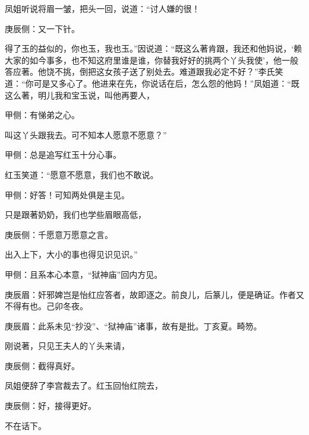 \begin{parag}
    凤姐听说将眉一皱，把头一回，说道：“讨人嫌的很！\begin{note}庚辰侧：又一下针。\end{note}得了玉的益似的，你也玉，我也玉。”因说道：“既这么著肯跟，我还和他妈说，‘赖大家的如今事多，也不知这府里谁是谁，你替我好好的挑两个丫头我使’，他一般答应著。他饶不挑，倒把这女孩子送了别处去。难道跟我必定不好？”李氏笑道：“你可是又多心了。他进来在先，你说话在后，怎么怨的他妈！”凤姐道：“既这么著，明儿我和宝玉说，叫他再要人，\begin{note}甲侧：有悌弟之心。\end{note}叫这丫头跟我去。可不知本人愿意不愿意？”\begin{note}甲侧：总是追写红玉十分心事。\end{note}红玉笑道：“愿意不愿意，我们也不敢说。\begin{note}甲侧：好答！可知两处俱是主见。\end{note}只是跟著奶奶，我们也学些眉眼高低，\begin{note}庚辰侧：千愿意万愿意之言。\end{note}出入上下，大小的事也得见识见识。”\begin{note}甲侧：且系本心本意，“狱神庙”回内方见。\end{note}\begin{note}庚辰眉：奸邪婢岂是怡红应答者，故即逐之。前良儿，后篆儿，便是确证。作者又不得有也。己卯冬夜。\end{note}\begin{note}庚辰眉：此系未见“抄没”、“狱神庙”诸事，故有是批。丁亥夏。畸笏。\end{note}刚说著，只见王夫人的丫头来请，\begin{note}庚辰侧：截得真好。\end{note}凤姐便辞了李宫裁去了。红玉回怡红院去，\begin{note}庚辰侧：好，接得更好。\end{note}不在话下。
\end{parag}



